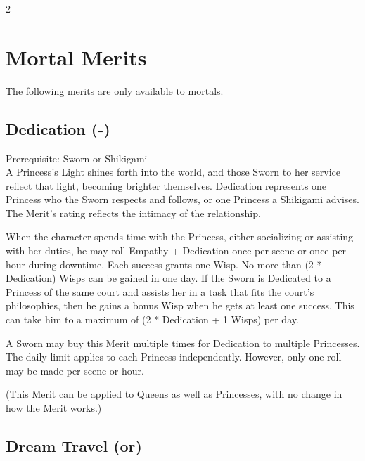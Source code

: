 \begin{multicols}{2}
\section*{Mortal Merits}

The following merits are only available to mortals. 

\subsection*{Dedication (\textbullet\nobreak\hspace{.16667em}-\nobreak\hspace{.16667em}\textbullet\textbullet\textbullet\textbullet\textbullet)}

Prerequisite: Sworn or Shikigami \\

\noindent A Princess's Light shines forth into the world, and those Sworn to her service reflect that light, becoming brighter themselves. Dedication represents one Princess who the Sworn respects and follows, or one Princess a Shikigami advises. The Merit's rating reflects the intimacy of the relationship. 

When the character spends time with the Princess, either socializing or assisting with her duties, he may roll Empathy + Dedication once per scene or once per hour during downtime. Each success grants one Wisp. No more than (2 * Dedication) Wisps can be gained in one day. If the Sworn is Dedicated to a Princess of the same court and assists her in a task that fits the court's philosophies, then he gains a bonus Wisp when he gets at least one success. This can take him to a maximum of (2 * Dedication + 1 Wisps) per day.

A Sworn may buy this Merit multiple times for Dedication to multiple Princesses. The daily limit applies to each Princess independently. However, only one roll may be made per scene or hour. 

(This Merit can be applied to Queens as well as Princesses, with no change in how the Merit works.)

\subsection*{Dream Travel (\textbullet\nobreak\hspace{.16667em}or\nobreak\hspace{.16667em}\textbullet\textbullet\textbullet)}


\end{multicols}
